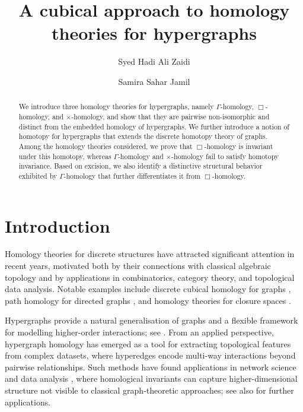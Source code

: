 \documentclass[11pt]{amsart}
\title[Cubical homology theories for hypergraphs]
{A cubical approach to homology theories for hypergraphs}
\author{Syed Hadi Ali Zaidi}
\author{Samira Sahar Jamil}
\begin{document}
\begin{abstract}
We introduce three homology theories for hypergraphs, \linebreak
namely $\Gamma$-homology, $\Box$-homology, and $\times$-homology, and show that they are pairwise non-isomorphic and distinct from the embedded homology of hypergraphs. We further introduce a notion of homotopy for hypergraphs that extends the discrete homotopy theory of graphs. Among the homology theories considered, we prove that $\Box$-homology is invariant under this homotopy, whereas $\Gamma$-homology and $\times$-homology fail to satisfy homotopy invariance. Based on excision, we also identify a distinctive structural behavior exhibited by $\Gamma$-homology that further differentiates it from $\Box$-homology.
\end{abstract}

\maketitle


\section{Introduction}
Homology theories for discrete structures have attracted significant attention in recent years, motivated both by their connections with classical algebraic topology and by applications in combinatorics, category theory, and topological data analysis. Notable examples include discrete cubical homology for graphs \cite{HG_Barcelo19}, path homology for directed graphs \cite{HG_Grig18}, and homology theories for closure spaces \cite{HG_bubenik21, HG_bubenik22}.

Hypergraphs provide a natural generalisation of graphs and a flexible framework for modelling higher-order interactions; see \cite{HG_Emilie,HG_Bretto}. From an applied perspective, hypergraph homology has emerged as a tool for extracting topological features from complex datasets, where hyperedges encode multi-way interactions beyond pairwise relationships. Such methods have found applications in network science and data analysis \cite{HG_Emilie,HG_Bressan}, where homological invariants can capture higher-dimensional \linebreak structure not visible to classical graph-theoretic approaches; see also \cite{HG_bretto13,HG_Gaspar26,HG_Liu24} for further applications.
\end{document}
